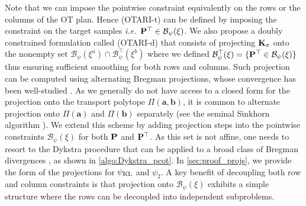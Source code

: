 Note that we can impose the pointwise constraint equivalently on the rows or the columns of the OT plan. Hence (OTARI-t) can be defined by imposing the constraint on the target samples \textit{i.e.}\ ${\mathbf{P}}^\top \in \mathcal{B}_\psi(\xi)$.
We also propose a doubly constrained formulation called (OTARI-d) that consists of projecting ${\mathbf{K}}_\sigma$ onto the nonempty set $\mathcal{B}_\psi(\xi^{a}) \cap \mathcal{B}^\top_\psi(\xi^b)$ 
where we defined $\mathcal{B}^\top_\psi(\xi) = \{ {\mathbf{P}}^\top \in \mathcal{B}_\psi(\xi)\}$ thus ensuring sufficient smoothing for both rows and columns.
Such projection can be computed using alternating Bregman projections, whose convergence has been well-studied \cite{censor1998dykstra, benamou2015iterative}.
As we generally do not have access to a closed form for the projection onto the transport polytope $\Pi(\bm{a}, \bm{b})$, it is common to alternate projection onto $\Pi(\bm{a})$ and $\Pi(\bm{b})$ separately (see \eg the seminal Sinkhorn algorithm \cite{cuturi2013sinkhorn}).
We extend this scheme by adding projection steps into the pointwise constraints $\mathcal{B}_\psi(\xi)$ for both ${\mathbf{P}}$ and ${\mathbf{P}}^\top$. As this set is not affine, one needs to resort to the Dykstra procedure \cite{dykstra1983algorithm} that can be applied to a broad class of Bregman divergences \cite{bauschke2000dykstras}, as shown in \cref{algo:Dykstra_pcot}.
In \cref{sec:proof_projs}, we provide the form of the projections for $\psi_{\operatorname{KL}}$ and $\psi_2$. A key benefit of decoupling both row and column constraints is that projection onto $\mathcal{B}_{\psi}(\xi)$ exhibits a simple structure where the rows can be decoupled into independent subproblems.
